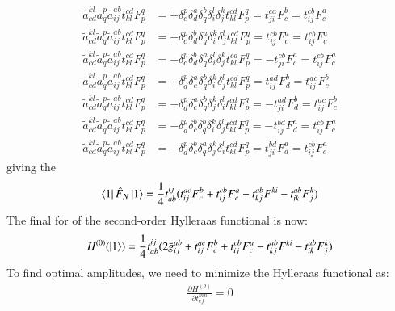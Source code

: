 \documentclass[journal=jacsat]{achemso}
\numberwithin{equation}{section}
\begin{document}
\begin{align}
\tilde{a}^{kl}_{cd}\tilde{a}^{p}_{q}\tilde{a}^{ab}_{ij}t^{cd}_{kl}F^{q}_{p}&=+ \delta^{p}_{c}\delta^{a}_{d}\delta^{b}_{q}\delta^{l}_{i}\delta^{k}_{j}t^{cd}_{kl}F^{q}_{p}=t^{ca}_{ji}F^{b}_{c}=t^{cb}_{ij}F^{a}_{c}\\
\tilde{a}^{kl}_{cd}\tilde{a}^{p}_{q}\tilde{a}^{ab}_{ij}t^{cd}_{kl}F^{q}_{p}&=+ \delta^{p}_{c}\delta^{b}_{d}\delta^{a}_{q}\delta^{k}_{i}\delta^{l}_{j}t^{cd}_{kl}F^{q}_{p}=t^{cb}_{ij}F^{a}_{c}=t^{cb}_{ij}F^{a}_{c}\\
\tilde{a}^{kl}_{cd}\tilde{a}^{p}_{q}\tilde{a}^{ab}_{ij}t^{cd}_{kl}F^{q}_{p}&=- \delta^{p}_{c}\delta^{b}_{d}\delta^{a}_{q}\delta^{l}_{i}\delta^{k}_{j}t^{cd}_{kl}F^{q}_{p}=-t^{cb}_{ji}F^{a}_{c}=t^{cb}_{ij}F^{a}_{c}\\
\tilde{a}^{kl}_{cd}\tilde{a}^{p}_{q}\tilde{a}^{ab}_{ij}t^{cd}_{kl}F^{q}_{p}&=+ \delta^{p}_{d}\delta^{a}_{c}\delta^{b}_{q}\delta^{k}_{i}\delta^{l}_{j}t^{cd}_{kl}F^{q}_{p}=t^{ad}_{ij}F^{b}_{d}=t^{ac}_{ij}F^{b}_{c}\\
\tilde{a}^{kl}_{cd}\tilde{a}^{p}_{q}\tilde{a}^{ab}_{ij}t^{cd}_{kl}F^{q}_{p}&=- \delta^{p}_{d}\delta^{a}_{c}\delta^{b}_{q}\delta^{k}_{j}\delta^{l}_{i}t^{cd}_{kl}F^{q}_{p}=-t^{ad}_{ji}F^{b}_{d}=t^{ac}_{ij}F^{b}_{c}\\
\tilde{a}^{kl}_{cd}\tilde{a}^{p}_{q}\tilde{a}^{ab}_{ij}t^{cd}_{kl}F^{q}_{p}&=- \delta^{p}_{d}\delta^{b}_{c}\delta^{b}_{q}\delta^{k}_{i}\delta^{l}_{j}t^{cd}_{kl}F^{q}_{p}=-t^{bd}_{ij}F^{a}_{d}=t^{cb}_{ij}F^{a}_{c}\\
\tilde{a}^{kl}_{cd}\tilde{a}^{p}_{q}\tilde{a}^{ab}_{ij}t^{cd}_{kl}F^{q}_{p}&=- \delta^{p}_{d}\delta^{b}_{c}\delta^{a}_{q}\delta^{k}_{j}\delta^{l}_{i}t^{cd}_{kl}F^{q}_{p}=t^{bd}_{ji}F^{a}_{d}=t^{cb}_{ij}F^{a}_{c}
\end{align}
giving the
\begin{align}
\bra{1}\hat{F}_{N}\ket{1}=\frac{1}{4}t^{ij}_{ab}(t^{ac}_{ij}F^{b}_{c}+t^{cb}_{ij}F^{a}_{c}-t^{ab}_{kj}F^{ki}-t^{ab}_{ik}F^{k}_{j})
\end{align}
The final for of the second-order Hylleraas functional is now:
\begin{align}
H^{(0)}(\ket{1})=\frac{1}{4}t^{ij}_{ab}(2\bar{g}^{ab}_{ij}+t^{ac}_{ij}F^{b}_{c}+t^{cb}_{ij}F^{a}_{c}-t^{ab}_{kj}F^{ki}-t^{ab}_{ik}F^{k}_{j})
\end{align}
To find optimal amplitudes, we need to minimize the Hylleraas functional as:
\begin{align}
\frac{\partial H^{(2)}}{\partial t^{mn}_{ef}}=0
\end{align}
\end{document}
